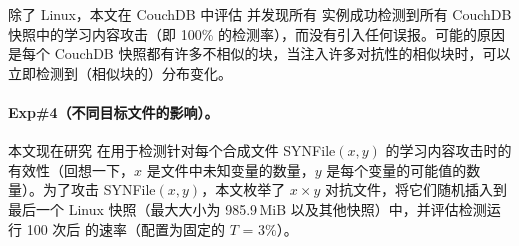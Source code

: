 除了 Linux，本文在 CouchDB 中评估 \sysnameF 并发现所有 \sysnameF 实例成功检测到所有 CouchDB 快照中的学习内容攻击（即 100\% 的检测率），而没有引入任何误报。可能的原因是每个 CouchDB 快照都有许多不相似的块，当注入许多对抗性的相似块时，\sysnameF 可以立即检测到（相似块的）分布变化。


\paragraph*{Exp\#4（不同目标文件的影响）。}
本文现在研究 \sysnameF 在用于检测针对每个合成文件 SYNFile$(x, y)$ 的学习内容攻击时的有效性（回想一下，$x$ 是文件中未知变量的数量，$y $ 是每个变量的可能值的数量）。为了攻击 SYNFile$(x, y)$，本文枚举了 $x\times y$ 对抗文件，将它们随机插入到最后一个 Linux 快照（最大大小为 985.9\,MiB 以及其他快照）中，并评估检测运行 100 次后 \sysnameF 的速率（配置为固定的 $T$ = 3\%）。


